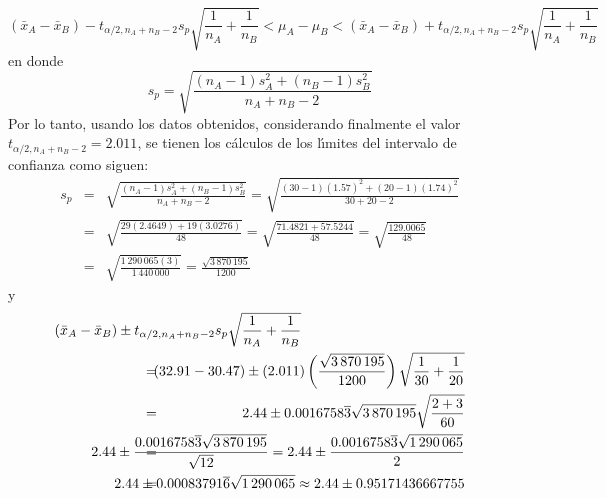 \begin{solucion}
\begin{enumerate}
  \begin{equation*}
   \left( \bar{x}_A - \bar{x}_B \right) - t_{\alpha/2,n_A+n_B-2} s_p \sqrt{\frac{1}{n_A} + \frac{1}{n_B}} < \mu_A - \mu_B < \left( \bar{x}_A - \bar{x}_B \right) + t_{\alpha/2,n_A+n_B-2} s_p \sqrt{\frac{1}{n_A} + \frac{1}{n_B}}
  \end{equation*}
  en donde
  \begin{equation*}
   s_p = \sqrt{\frac{\left(n_A - 1\right) s_A^2 + \left( n_B -1 \right)s_B^2 }{n_A + n_B - 2}}
  \end{equation*}
  Por lo tanto, usando los datos obtenidos, considerando finalmente el valor $t_{\alpha/2,n_A+n_B-2} = 2.011$, se tienen los c\'alculos de los l\'{\i}mites del intervalo de confianza como siguen:
  \begin{eqnarray*}
   s_p & = & \sqrt{\frac{\left(n_A - 1\right) s_A^2 + \left( n_B -1 \right)s_B^2 }{n_A + n_B - 2}} = \sqrt{\frac{(30 - 1)(1.57)^2 + (20 - 1)(1.74)^2}{30 + 20 - 2}} \\
   & = & \sqrt{\frac{29(2.4649) + 19(3.0276)}{48}} = \sqrt{\frac{71.4821 + 57.5244}{48}} = \sqrt{\frac{129.0065}{48}} \\
   & = & \sqrt{\frac{1\,290\,065 (3)}{1\,440\,000}} = \frac{\sqrt{3\,870\,195}}{1200}
  \end{eqnarray*}
  y
  \begin{eqnarray*}
   \left( \bar{x}_A - \bar{x}_B \right) \pm t_{\alpha/2,n_A+n_B-2} s_p \sqrt{\frac{1}{n_A} + \frac{1}{n_B}} \\
   & \hspace{-4cm} = & \hspace{-2cm} (32.91 - 30.47) \pm (2.011)\left( \frac{\sqrt{3\,870\,195}}{1200} \right) \sqrt{\frac{1}{30} + \frac{1}{20}} \\
   & \hspace{-4cm} = & \hspace{-2cm} 2.44 \pm 0.0016758\overline{3}\sqrt{3\,870\,195} \sqrt{\frac{2+3}{60}} \\
   & \hspace{-4cm} = & \hspace{-2cm} 2.44 \pm \frac{0.0016758\overline{3}\sqrt{3\,870\,195}}{\sqrt{12}}  =  2.44 \pm \frac{0.0016758\overline{3}\sqrt{1\,290\,065}}{2} \\
   & \hspace{-4cm} = & \hspace{-2cm} 2.44 \pm 0.00083791\overline{6}\sqrt{1\,290\,065} \approx 2.44 \pm 0.95171436667755
  \end{eqnarray*}

\end{enumerate}
\end{solucion}
